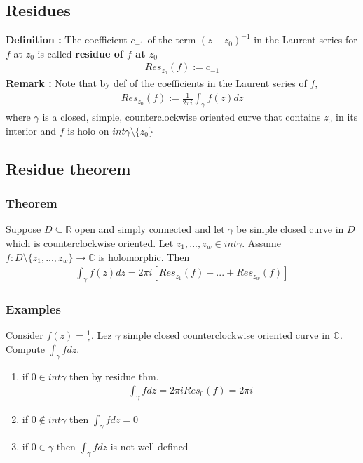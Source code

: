 \subsection{Residues}
\textbf{Definition :} The coefficient $c_{-1}$ of the term $(z-z_0)^{-1}$ in the Laurent series for $f$ at $z_0$ is called \textbf{residue of $f$ at $z_0$}
\begin{align*}
    Res_{z_0}(f) := c_{-1}
\end{align*}
\textbf{Remark :} Note that by def of the coefficients in the Laurent series of $f$,
\begin{align*}
    Res_{z_0}(f) := \frac{1}{2 \pi i}\int_\gamma f(z)dz
\end{align*}
where $\gamma$ is a closed, simple, counterclockwise oriented curve that contains $z_0$ in its interior and $f$ is holo on $int \gamma \setminus \{z_0\}$
\subsection{Residue theorem}
\subsubsection{Theorem}
Suppose $D \subseteq \mathbb{R}$ open and simply connected and let $\gamma$ be simple closed curve in $D$ which is counterclockwise oriented. Let $z_1,...,z_w \in int \gamma$.
Assume $f: D \setminus \{z_1,...,z_w \} \rightarrow \mathbb{C}$ is holomorphic. Then 
\begin{align*}
    \int_\gamma f(z)dz = 2 \pi i[Res_{z_1}(f) + ... + Res_{z_w}(f)]
\end{align*}
\subsubsection{Examples}
Consider $f(z) = \frac{1}{z}$. Lez $\gamma$ simple closed counterclockwise oriented curve in $\mathbb{C}$. Compute $\int_\gamma fdz$.
\begin{enumerate}
    \item if $0 \in int \gamma$ then by residue thm. \begin{align*}
        \int_\gamma fdz = 2 \pi i Res_0(f) = 2 \pi i
    \end{align*}
    \item if $0 \notin int \gamma $ then $\int_\gamma fdz = 0$
    \item if $0 \in \gamma$ then $\int_\gamma fdz$ is not well-defined
\end{enumerate}

